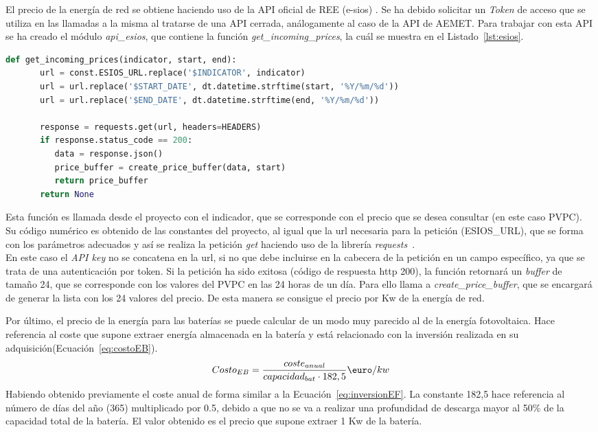 	El precio de la energía de red se obtiene haciendo uso de la \gls{API} oficial de \gls{REE} (e-sios) \cite{Ree}. Se ha debido solicitar un \textit{Token} de acceso que se utiliza en las llamadas a la misma al tratarse de una \gls{API} cerrada, análogamente al caso de la \gls{API} de AEMET. Para trabajar con esta \gls{API} se ha creado el módulo \textit{api\_esios}, que contiene la función \textit{get\_incoming\_prices}, la cuál se muestra en el Listado~\ref{lst:esios}.

	\begin{lstlisting}[language=Python,float=ht,caption={Función para obtener el precio del mercado eléctrico},label={lst:esios}]
	def get_incoming_prices(indicator, start, end):
	   url = const.ESIOS_URL.replace('$INDICATOR', indicator)
	   url = url.replace('$START_DATE', dt.datetime.strftime(start, '%Y/%m/%d'))
	   url = url.replace('$END_DATE', dt.datetime.strftime(end, '%Y/%m/%d'))

	   response = requests.get(url, headers=HEADERS)
	   if response.status_code == 200:
	      data = response.json()
	      price_buffer = create_price_buffer(data, start)
	      return price_buffer
	   return None
	\end{lstlisting}

	Esta función es llamada desde el proyecto con el indicador, que se corresponde con el precio que se desea consultar (en este caso \gls{PVPC}). Su código numérico es obtenido de las constantes del proyecto, al igual que la url necesaria para la petición (ESIOS\_URL), que se forma con los parámetros adecuados y así se realiza la petición \textit{get} haciendo uso de la librería \textit{requests}~\cite{Kenn11}.\\En este caso el \textit{\gls{API} key} no se concatena en la url, si no que debe incluirse en la cabecera de la petición en un campo específico, ya que se trata de una autenticación por token. Si la petición ha sido exitosa (código de respuesta http 200), la función retornará un \textit{buffer} de tamaño 24, que se corresponde con los valores del \gls{PVPC} en las 24 horas de un día. Para ello llama a \textit{create\_price\_buffer}, que se encargará de generar la lista con los 24 valores del precio. De esta manera se consigue el precio por Kw de la energía de red.

	Por último, el precio de la energía para las baterías se puede calcular de un modo muy parecido al de la energía fotovoltaica. Hace referencia al coste que supone extraer energía almacenada en la batería y está relacionado con la inversión realizada en su adquisición(Ecuación~\ref{eq:costoEB}).
	\begin{equation}
          \label{eq:costoEB}
	Costo_{EB} = \frac{coste_{anual}}{capacidad_{bat}\cdot182,5} \textup{\euro}/kw
	\end{equation}
	Habiendo obtenido previamente el coste anual de forma similar a la Ecuación~\ref{eq:inversionEF}. La constante 182,5 hace referencia al número de días del año (365) multiplicado por 0.5, debido a que no se va a realizar una profundidad de descarga mayor al 50\% de la capacidad total de la batería. El valor obtenido es el precio que supone extraer 1 Kw de la batería.
